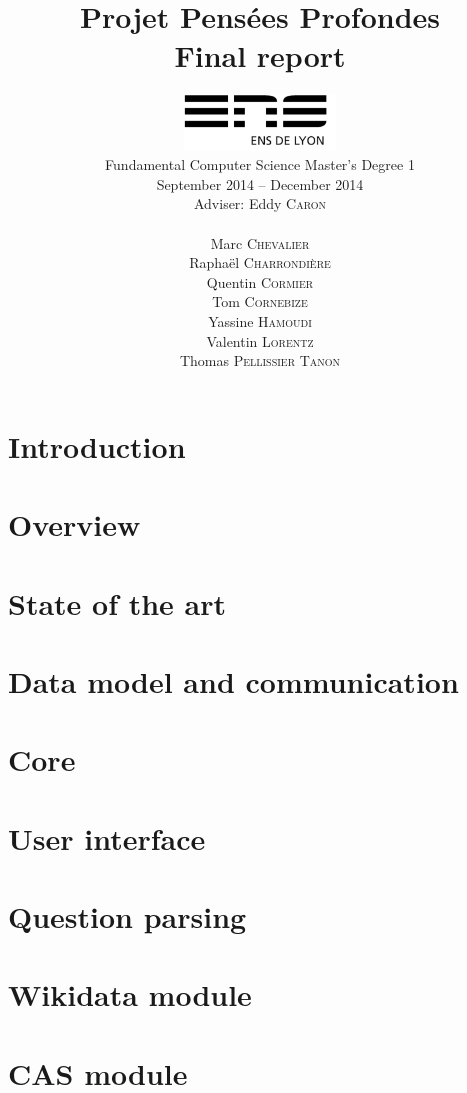 \documentclass[a4paper,10pt]{report}
\title{Projet Pensées Profondes\\\large Final report}
\author{\includegraphics[width=0.3\textwidth]{../logo_ensl.pdf}\\[50pt]
Fundamental Computer Science Master's Degree 1\\September 2014 \--- December 2014\\[50pt]
Adviser: Eddy \textsc{Caron}\\[50pt]
\begin{minipage}{0.4\textwidth}
    \begin{flushleft} \large
        Marc \textsc{Chevalier}
        \\
        Raphaël \textsc{Charrondière}
        \\
        Quentin \textsc{Cormier}
        \\
        Tom \textsc{Cornebize}
    \end{flushleft}
\end{minipage}
\begin{minipage}{0.4\textwidth}
    \begin{flushright} \large
        Yassine \textsc{Hamoudi}
        \\
        Valentin \textsc{Lorentz}
        \\
        Thomas \textsc{Pellissier Tanon}
        \\
    \end{flushright}
\end{minipage}
}
\date{}
\begin{document}
\maketitle



\tableofcontents

\chapter*{Introduction}
    

\chapter{Overview}
    

\chapter{State of the art}
    

\chapter{Data model and communication}
    

\chapter{Core}
    

\chapter{User interface}
    

\chapter{Question parsing}
    
    
    
    

\chapter{Wikidata module}
    
    
\chapter{CAS module}
    
\end{document}
